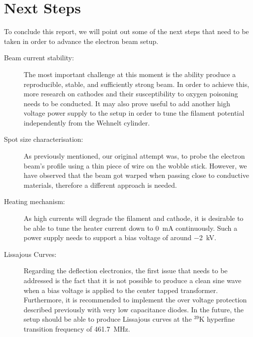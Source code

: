 
\chapter{Next Steps}

To conclude this report, we will point out some of the next steps that need to be taken in order to advance the electron beam setup. 

\begin{description}
	\item[Beam current stability:] The most important challenge at this moment is the ability produce a reproducible, stable, and sufficiently strong beam. In order to achieve this, more research on cathodes and their susceptibility to oxygen poisoning needs to be conducted. It may also prove useful to add another high voltage power supply to the setup in order to tune the filament potential independently from the Wehnelt cylinder. 
	\item[Spot size characterisation:] As previously mentioned, our original attempt was, to probe the electron beam's profile using a thin piece of wire on the wobble stick. However, we have observed that the beam got warped when passing close to conductive materials, therefore a different approach is needed. 
	\item[Heating mechanism:] As high currents will degrade the filament and cathode, it is desirable to be able to tune the heater current down to \SI{0}{\milli\ampere} continuously. Such a power supply needs to support a bias voltage of around \SI{-2}{\kilo\volt}. 
	\item[Lissajous Curves:] Regarding the deflection electronics, the first issue that needs to be addressed is the fact that it is not possible to produce a clean sine wave when a bias voltage is applied to  the center tapped transformer. Furthermore, it is recommended to implement the over voltage protection described previously with very low capacitance diodes.  
	In the future, the setup should be able to produce Lissajous curves at the  $^{39}\mathrm{K}$ hyperfine transition frequency of \SI{461.7}{\mega\hertz}. 
\end{description}